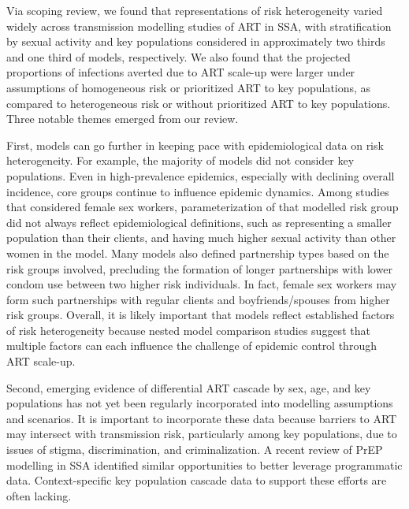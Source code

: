 Via scoping review, we found that representations of risk heterogeneity varied widely across
transmission modelling studies of ART in SSA, with
stratification by sexual activity and key populations considered in approximately
two thirds and one third of models, respectively.
We also found that the projected proportions of infections averted due to ART scale-up were
larger under assumptions of homogeneous risk or prioritized ART to key populations,
as compared to heterogeneous risk or without prioritized ART to key populations.
Three notable themes emerged from our review.
\par
First, models can go further in keeping pace with epidemiological data on risk heterogeneity.
For example, the majority of models did not consider key populations.
Even in high-prevalence epidemics, especially with declining overall incidence,
core groups continue to influence epidemic dynamics.\cite{Brown2019,Ortblad2019}
Among studies that considered female sex workers,
parameterization of that modelled risk group did not always
reflect epidemiological definitions, such as
representing a smaller population than their clients,
and having much higher sexual activity than other women in the model.
\cite{Watts2010,Scorgie2012}
Many models also defined partnership types based on the risk groups involved,
precluding the formation of longer partnerships with lower condom use between two higher risk individuals.
In fact, female sex workers may form such partnerships with regular clients
and boyfriends/spouses from higher risk groups.\cite{Scorgie2012}
Overall, it is likely important that models reflect established factors of risk heterogeneity
because nested model comparison studies suggest that multiple factors
can each influence the challenge of epidemic control through ART scale-up.
\cite{Dodd2010,Hontelez2013}
\par
Second, emerging evidence of differential ART cascade by sex, age, and key populations
\cite{Mountain2014,Lancaster2016,Green2020}
has not yet been regularly incorporated into modelling assumptions and scenarios.
It is important to incorporate these data because barriers to ART may intersect with transmission risk,
particularly among key populations, due to issues of stigma, discrimination, and criminalization.
\cite{Ortblad2019,Baral2019}
A recent review of PrEP modelling in SSA\cite{Case2019}
identified similar opportunities to better leverage programmatic data.
Context-specific key population cascade data to support these efforts are often lacking.\cite{Mountain2014}
